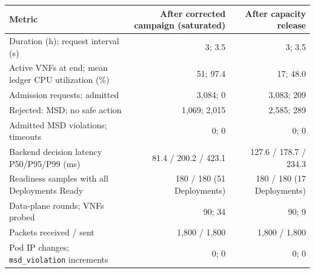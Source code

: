 \begin{tabular}{@{}lrr@{}}
\toprule
Metric & After corrected campaign (saturated) & After capacity release \\
\midrule
Duration (h); request interval (s) & 3; 3.5 & 3; 3.5 \\
Active VNFs at end; mean ledger CPU utilization (\%) & 51; 97.4 & 17; 48.0 \\
Admission requests; admitted & 3,084; 0 & 3,083; 209 \\
Rejected: MSD; no safe action & 1,069; 2,015 & 2,585; 289 \\
Admitted MSD violations; timeouts & 0; 0 & 0; 0 \\
Backend decision latency P50/P95/P99 (ms) & 81.4 / 200.2 / 423.1 & 127.6 / 178.7 / 234.3 \\
Readiness samples with all Deployments Ready & 180 / 180 (51 Deployments) & 180 / 180 (17 Deployments) \\
Data-plane rounds; VNFs probed & 90; 34 & 90; 9 \\
Packets received / sent & 1,800 / 1,800 & 1,800 / 1,800 \\
Pod IP changes; \texttt{msd\_violation} increments & 0; 0 & 0; 0 \\
\bottomrule
\end{tabular}
